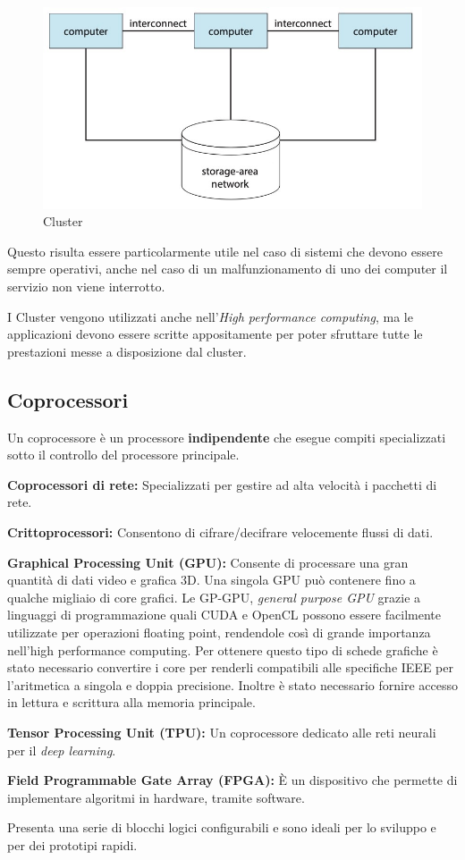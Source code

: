 \begin{figure}[H]
    \centering
    \includegraphics[width=0.5\linewidth]{assets/cluster.jpeg}
    \caption{Cluster}
\end{figure}

\begin{note}
    Questo risulta essere particolarmente utile nel caso di sistemi che devono essere sempre operativi, anche nel caso di un malfunzionamento di uno dei computer il servizio non viene interrotto.

    \spacer
    I Cluster vengono utilizzati anche nell'\textit{High performance computing}, ma le applicazioni devono essere scritte appositamente per poter sfruttare tutte le prestazioni messe a disposizione dal cluster.
\end{note}

\subsection{Coprocessori}
Un coprocessore è un processore \textbf{indipendente} che esegue compiti specializzati sotto il controllo del processore principale.

\spacer
\begin{sitemize}
    \item \textbf{Coprocessori di rete:} Specializzati per gestire ad alta velocità i pacchetti di rete.
    \item \textbf{Crittoprocessori:} Consentono di cifrare/decifrare velocemente flussi di dati.
    \item \textbf{Graphical Processing Unit (GPU):} Consente di processare una gran quantità di dati video e grafica 3D. Una singola GPU può contenere fino a qualche migliaio di core grafici.
    \spacer
    Le GP-GPU, \textit{general purpose GPU} grazie a linguaggi di programmazione quali CUDA e OpenCL possono essere facilmente utilizzate per operazioni floating point, rendendole così di grande importanza nell'high performance computing.
    \spacer
    Per ottenere questo tipo di schede grafiche è stato necessario convertire i core per renderli compatibili alle specifiche IEEE per l'aritmetica a singola e doppia precisione. Inoltre è stato necessario fornire accesso in lettura e scrittura alla memoria principale.
    \item \textbf{Tensor Processing Unit (TPU):} Un coprocessore dedicato alle reti neurali per il \textit{deep learning}.
    \item \textbf{Field Programmable Gate Array (FPGA):} È un dispositivo che permette di implementare algoritmi in hardware, tramite software.

    Presenta una serie di blocchi logici configurabili e sono ideali per lo sviluppo e per dei prototipi rapidi.
\end{sitemize}
